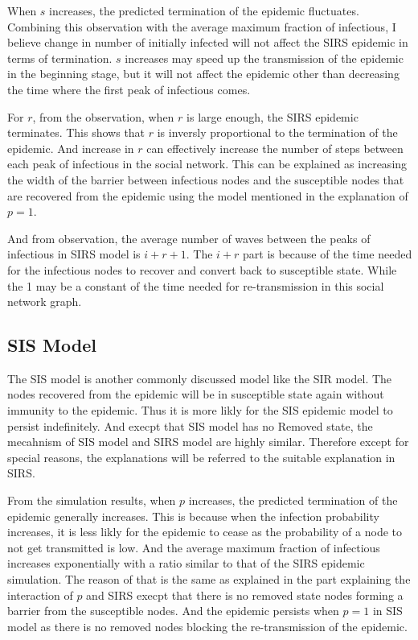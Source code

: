 \documentclass{subfile}
\begin{document}
  When \(s\) increases, the predicted termination of the epidemic fluctuates. Combining this observation with the average maximum fraction of infectious, I believe change in number of initially infected will not affect the SIRS epidemic in terms of termination. \(s\) increases may speed up the transmission of the epidemic in the beginning stage, but it will not affect the epidemic other than decreasing the time where the first peak of infectious comes.

  For \(r\), from the observation, when \(r\) is large enough, the SIRS epidemic terminates. This shows that \(r\) is inversly proportional to the termination of the epidemic. And increase in \(r\) can effectively increase the number of steps between each peak of infectious in the social network. This can be explained as increasing the width of the barrier between infectious nodes and the susceptible nodes that are recovered from the epidemic using the model mentioned in the explanation of \(p=1\).

  And from observation, the average number of waves between the peaks of infectious in SIRS model is \(i+r+1\). The \(i+r\) part is because of the time needed for the infectious nodes to recover and convert back to susceptible state. While the 1 may be a constant of the time needed for re-transmission in this social network graph.

  \subsection{SIS Model}
  The SIS model is another commonly discussed model like the SIR model. The nodes recovered from the epidemic will be in susceptible state again without immunity to the epidemic. Thus it is more likly for the SIS epidemic model to persist indefinitely. And execpt that SIS model has no Removed state, the mecahnism of SIS model and SIRS model are highly similar. Therefore except for special reasons, the explanations will be referred to the suitable explanation in SIRS.

  From the simulation results, when \(p\) increases, the predicted termination of the epidemic generally increases. This is because when the infection probability increases, it is less likly for the epidemic to cease as the probability of a node to not get transmitted is low. And the average maximum fraction of infectious increases exponentially with a ratio similar to that of the SIRS epidemic simulation. The reason of that is the same as explained in the part explaining the interaction of \(p\) and SIRS execpt that there is no removed state nodes forming a barrier from the susceptible nodes. And the epidemic persists when \(p=1\) in SIS model as there is no removed nodes blocking the re-transmission of the epidemic.
\end{document}
